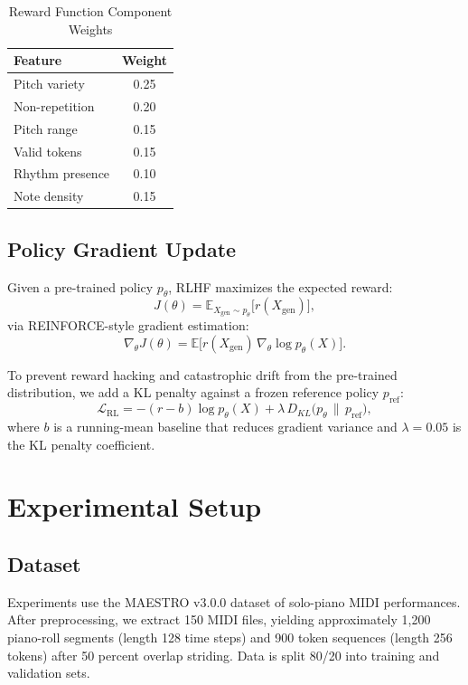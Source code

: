 \documentclass[conference]{IEEEtran}
\begin{document}
\begin{table}[htbp]
\caption{Reward Function Component Weights}
\label{tab:reward}
\centering
\begin{tabular}{@{}lc@{}}
\toprule
\textbf{Feature} & \textbf{Weight} \\
\midrule
Pitch variety      & 0.25 \\
Non-repetition     & 0.20 \\
Pitch range        & 0.15 \\
Valid tokens       & 0.15 \\
Rhythm presence    & 0.10 \\
Note density       & 0.15 \\
\bottomrule
\end{tabular}
\end{table}

\subsection{Policy Gradient Update}
Given a pre-trained policy $p_\theta$, RLHF maximizes the expected reward:
\begin{equation}
J(\theta) = \mathbb{E}_{X_{\text{gen}} \sim p_\theta}\bigl[r(X_{\text{gen}})\bigr],
\end{equation}
via REINFORCE-style gradient estimation:
\begin{equation}
\nabla_\theta J(\theta) = \mathbb{E}\bigl[r(X_{\text{gen}}) \, \nabla_\theta \log p_\theta(X)\bigr].
\end{equation}

To prevent reward hacking and catastrophic drift from the pre-trained
distribution, we add a KL penalty against a frozen reference policy
$p_{\text{ref}}$:
\begin{equation}
\mathcal{L}_{\text{RL}} = -(r - b) \log p_\theta(X) + \lambda \, D_{KL}\bigl(p_\theta \,\|\, p_{\text{ref}}\bigr),
\end{equation}
where $b$ is a running-mean baseline that reduces gradient variance and
$\lambda = 0.05$ is the KL penalty coefficient.

\section{Experimental Setup} \label{sec:eval}

\subsection{Dataset}
Experiments use the MAESTRO v3.0.0 dataset of solo-piano MIDI
performances. After preprocessing, we extract 150 MIDI files, yielding
approximately 1,200 piano-roll segments (length 128 time steps) and 900
token sequences (length 256 tokens) after 50 percent overlap striding.
Data is split 80/20 into training and validation sets.
\end{document}
